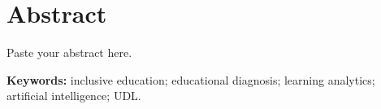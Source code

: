 \chapter*{Abstract}

Paste your abstract here.

\noindent\textbf{Keywords:} inclusive education; educational diagnosis; learning analytics; artificial intelligence; UDL.
\clearpage